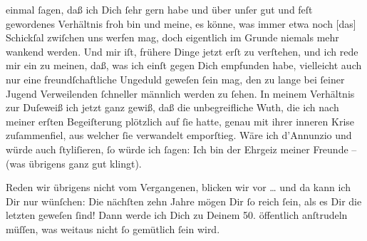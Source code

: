 \pstart
           einmal{ }ſagen, daß ich Dich{ }ſehr gern habe und über unſer gut und feſt gewordenes
               Verhältnis froh bin und meine, es könne, was immer etwa noch {[}das{]}{ }Schickſal zwiſchen uns werfen mag, doch eigentlich
               im Grunde {\pb}niemals mehr wankend werden. Und mir
               iſt, frühere Dinge jetzt erſt zu verſtehen, und ich rede mir ein zu meinen, daß, was
               ich einſt gegen Dich empfunden habe, vielleicht auch nur eine freundſchaftliche
               Ungeduld geweſen{ }ſein mag, den zu lange bei{ }ſeiner Jugend Verweilenden{ }ſchneller
               männlich werden zu{ }ſehen. \label{LL248-2v}In meinem Verhältnis
                  zur Duſeweiß ich \introOben{}jetzt\introOben{} ganz
                  gewiß, daß die unbegreifliche Wuth, die ich nach meiner erſten Begeiſterung
                  plötzlich auf{ }ſie hatte,\label{LL248-2h} genau mit ihrer inneren Krise zuſammenfiel, aus
               welcher{ }ſie verwandelt emporſtieg. Wäre ich d’Annunzio und würde auch{ }ſtyliſieren,{ }ſo würde ich{ }ſagen: \label{LL248-1v}Ich bin der Ehrgeiz meiner Freunde\label{LL248-1h} –
                  \label{K_L01219-2v}\label{K_L01219-2} (was übrigens
               ganz {\pb}gut klingt).\pend
           
\pstart
           Reden wir übrigens nicht vom Vergangenen, blicken wir vor {\dots} und da kann ich Dir nur wünſchen: Die nächſten zehn Jahre mögen Dir{ }ſo reich{ }ſein,
               als es Dir die letzten geweſen \introOben{}ſind\introOben{}! Dann werde ich Dich zu
               Deinem 50. öffentlich anſtrudeln müſſen, was weitaus nicht{ }ſo gemütlich{ }ſein
               wird.\pend
           
